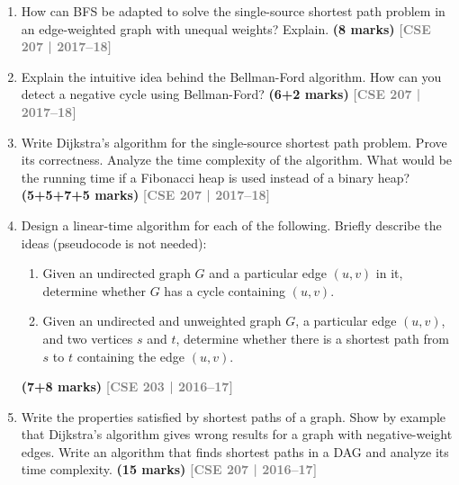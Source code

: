 \documentclass[12pt,a3paper]{article}
\newcommand{\yr}[1]{\hfill\textcolor{gray}{\small\textbf{[#1]}}}
\newcommand{\mk}[1]{\textcolor{orange!70!black}{\small\textbf{(#1 marks)}}}
\begin{document}
\begin{enumerate}
\item How can BFS be adapted to solve the single-source shortest path problem in an edge-weighted graph with unequal weights? Explain. \mk{8}
\yr{CSE 207 | 2017--18}

\item Explain the intuitive idea behind the Bellman-Ford algorithm. How can you detect a negative cycle using Bellman-Ford? \mk{6+2}
\yr{CSE 207 | 2017--18}

\item Write Dijkstra's algorithm for the single-source shortest path problem. Prove its correctness. Analyze the time complexity of the algorithm. What would be the running time if a Fibonacci heap is used instead of a binary heap? \mk{5+5+7+5}
\yr{CSE 207 | 2017--18}

\item Design a linear-time algorithm for each of the following. Briefly describe the ideas (pseudocode is not needed):
\begin{enumerate}
  \item Given an undirected graph $G$ and a particular edge $(u, v)$ in it, determine whether $G$ has a cycle containing $(u, v)$.
  \item Given an undirected and unweighted graph $G$, a particular edge $(u, v)$, and two vertices $s$ and $t$, determine whether there is a shortest path from $s$ to $t$ containing the edge $(u, v)$.
\end{enumerate}
\mk{7+8}
\yr{CSE 203 | 2016--17}

\item Write the properties satisfied by shortest paths of a graph. Show by example that Dijkstra's algorithm gives wrong results for a graph with negative-weight edges. Write an algorithm that finds shortest paths in a DAG and analyze its time complexity. \mk{15}
\yr{CSE 207 | 2016--17}


\end{enumerate}
\end{document}
